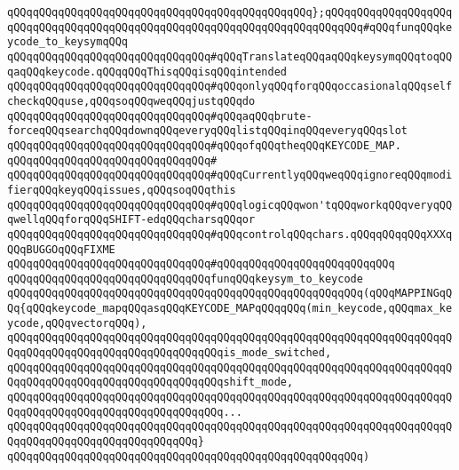 \verb|qQQqqQQqqQQqqQQqqQQqqQQqqQQqqQQqqQQqqQQqqQQqqQQq};qQQqqQQqqQQqqQQqqQQqqQQqqQQqqQQqqQQqqQQqqQQqqQQqqQQqqQQqqQQqqQQqqQQqqQQqqQQq#qQQqfunqQQqkeycode_to_keysymqQQq|\newline
\newline
\verb|qQQqqQQqqQQqqQQqqQQqqQQqqQQqqQQq#qQQqTranslateqQQqaqQQqkeysymqQQqtoqQQqaqQQqkeycode.qQQqqQQqThisqQQqisqQQqintended|\newline
\verb|qQQqqQQqqQQqqQQqqQQqqQQqqQQqqQQq#qQQqonlyqQQqforqQQqoccasionalqQQqselfcheckqQQquse,qQQqsoqQQqweqQQqjustqQQqdo|\newline
\verb|qQQqqQQqqQQqqQQqqQQqqQQqqQQqqQQq#qQQqaqQQqbrute-forceqQQqsearchqQQqdownqQQqeveryqQQqlistqQQqinqQQqeveryqQQqslot|\newline
\verb|qQQqqQQqqQQqqQQqqQQqqQQqqQQqqQQq#qQQqofqQQqtheqQQqKEYCODE_MAP.|\newline
\verb|qQQqqQQqqQQqqQQqqQQqqQQqqQQqqQQq#|\newline
\verb|qQQqqQQqqQQqqQQqqQQqqQQqqQQqqQQq#qQQqCurrentlyqQQqweqQQqignoreqQQqmodifierqQQqkeyqQQqissues,qQQqsoqQQqthis|\newline
\verb|qQQqqQQqqQQqqQQqqQQqqQQqqQQqqQQq#qQQqlogicqQQqwon'tqQQqworkqQQqveryqQQqwellqQQqforqQQqSHIFT-edqQQqcharsqQQqor|\newline
\verb|qQQqqQQqqQQqqQQqqQQqqQQqqQQqqQQq#qQQqcontrolqQQqchars.qQQqqQQqqQQqXXXqQQqBUGGOqQQqFIXME|\newline
\verb|qQQqqQQqqQQqqQQqqQQqqQQqqQQqqQQq#qQQqqQQqqQQqqQQqqQQqqQQqqQQq|\newline
\verb|qQQqqQQqqQQqqQQqqQQqqQQqqQQqqQQqfunqQQqkeysym_to_keycode|\newline
\verb|qQQqqQQqqQQqqQQqqQQqqQQqqQQqqQQqqQQqqQQqqQQqqQQqqQQqqQQq(qQQqMAPPINGqQQq{qQQqkeycode_mapqQQqasqQQqKEYCODE_MAPqQQqqQQq(min_keycode,qQQqmax_keycode,qQQqvectorqQQq),|\newline
\verb|qQQqqQQqqQQqqQQqqQQqqQQqqQQqqQQqqQQqqQQqqQQqqQQqqQQqqQQqqQQqqQQqqQQqqQQqqQQqqQQqqQQqqQQqqQQqqQQqqQQqqQQqis_mode_switched,|\newline
\verb|qQQqqQQqqQQqqQQqqQQqqQQqqQQqqQQqqQQqqQQqqQQqqQQqqQQqqQQqqQQqqQQqqQQqqQQqqQQqqQQqqQQqqQQqqQQqqQQqqQQqqQQqshift_mode,|\newline
\verb|qQQqqQQqqQQqqQQqqQQqqQQqqQQqqQQqqQQqqQQqqQQqqQQqqQQqqQQqqQQqqQQqqQQqqQQqqQQqqQQqqQQqqQQqqQQqqQQqqQQqqQQq...|\newline
\verb|qQQqqQQqqQQqqQQqqQQqqQQqqQQqqQQqqQQqqQQqqQQqqQQqqQQqqQQqqQQqqQQqqQQqqQQqqQQqqQQqqQQqqQQqqQQqqQQqqQQq}|\newline
\verb|qQQqqQQqqQQqqQQqqQQqqQQqqQQqqQQqqQQqqQQqqQQqqQQqqQQqqQQq)|\newline
